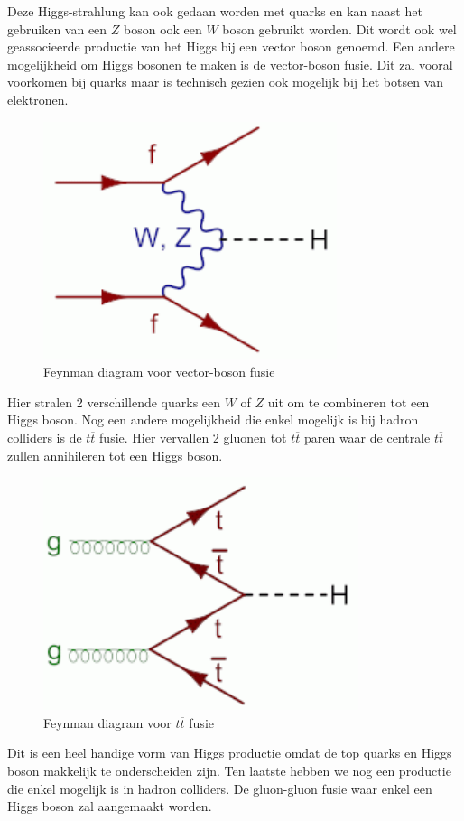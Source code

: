 \documentclass[../main.tex]{subfiles}
\begin{document}
Deze Higgs-strahlung kan ook gedaan worden met quarks en kan naast het gebruiken van een $Z$ boson ook een $W$ boson gebruikt worden. Dit wordt ook wel geassocieerde productie van het Higgs bij een vector boson genoemd. Een andere mogelijkheid om Higgs bosonen te maken is de vector-boson fusie. Dit zal vooral voorkomen bij quarks maar is technisch gezien ook mogelijk bij het botsen van elektronen.

\begin{figure}[h]
    \centering
    \includegraphics[width=0.5\linewidth]{higgs_boson/vec_bos_fusie.png}
    \caption{Feynman diagram voor vector-boson fusie}%
    \label{fig:higgs_boson/vec_bos_fusie}
\end{figure}

Hier stralen 2 verschillende quarks een $W$ of $Z$ uit om te combineren tot een Higgs boson. Nog een andere mogelijkheid die enkel mogelijk is bij hadron colliders is de $t\overline t$ fusie. Hier vervallen 2 gluonen tot $t\overline t$ paren waar de centrale $t\overline t$ zullen annihileren tot een Higgs boson.

\begin{figure}[h]
    \centering
    \includegraphics[width=0.5\linewidth]{higgs_boson/tt_fusie.png}
    \caption{Feynman diagram voor $t\overline t$ fusie}%
    \label{fig:higgs_boson/tt_fusie}
\end{figure}

Dit is een heel handige vorm van Higgs productie omdat de top quarks en Higgs boson makkelijk te onderscheiden zijn. Ten laatste hebben we nog een productie die enkel mogelijk is in hadron colliders. De gluon-gluon fusie waar enkel een Higgs boson zal aangemaakt worden.
\end{document}
